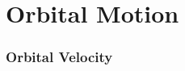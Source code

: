 \documentclass[12pt,compress,aspectratio=169]{beamer}
\begin{document}
\section{Orbital Motion}

\begin{frame}
  \frametitle{Orbital Velocity}
%
%      
\end{frame}
\end{document}
